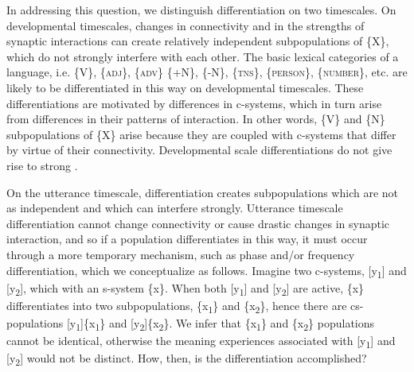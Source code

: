   In addressing this question, we distinguish differentiation on two timescales. On developmental timescales, changes in connectivity and in the strengths of synaptic interactions can create relatively independent subpopulations of \{X\}, which do not strongly interfere with each other. The basic lexical categories of a language, i.e. \{V\}, \{\textsc{adj}\}, \{\textsc{adv}\} \{+N\}, \{-N\}, \{\textsc{tns}\}, \{\textsc{person}\}, \{\textsc{number}\}, etc. are likely to be differentiated in this way on developmental timescales. These differentiations are motivated by differences in c-systems, which in turn arise from differences in their patterns of  interaction. In other words, \{V\} and \{N\} subpopulations of \{X\} arise because they are coupled with c-systems that differ by virtue of their  connectivity. Developmental scale differentiations do not give rise to strong .

  On the utterance timescale, differentiation creates subpopulations which are not as independent and which can interfere strongly. Utterance timescale differentiation cannot change connectivity or cause drastic changes in synaptic interaction, and so if a population differentiates in this way, it must occur through a more temporary mechanism, such as phase and/or frequency differentiation, which we conceptualize as follows. Imagine two c-systems, [y\textsubscript{1}] and [y\textsubscript{2}], which  with an s-system \{x\}. When both [y\textsubscript{1}] and [y\textsubscript{2}] are active, \{x\} differentiates into two subpopulations, \{x\textsubscript{1}\} and \{x\textsubscript{2}\}, hence there are cs-populations [y\textsubscript{1}]\{x\textsubscript{1}\} and [y\textsubscript{2}]\{x\textsubscript{2}\}. We infer that \{x\textsubscript{1}\} and \{x\textsubscript{2}\} populations cannot be identical, otherwise the meaning experiences associated with [y\textsubscript{1}] and [y\textsubscript{2}] would not be distinct. How, then, is the differentiation accomplished? 

